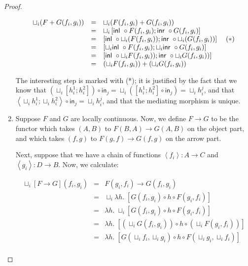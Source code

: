 \begin{proof}
\begin{enumerate}
\begin{displaymath}
\begin{array}{lcl}
  \sqcup_i (F + G (f_i,g_i)) 
   & = & \sqcup_i (F(f_i,g_i) + G(f_i,g_i)) \\
   & = & \sqcup_i \left[\mbox{\textsf{{inl }}}\circ F(f_i,g_i); 
                        \mbox{\textsf{{inr }}}\circ G(f_i,g_i)\right]\\
   & = & \left[\mbox{\textsf{{inl }}}\circ \sqcup_i (F(f_i,g_i));
               \mbox{\textsf{{inr }}}\circ \sqcup_i (G(f_i,g_i))\right] \;\;\;\;(*)\\
   & = & \left[\sqcup_i \mbox{\textsf{{inl }}}\circ F(f_i,g_i);
               \sqcup_i \mbox{\textsf{{inr }}}\circ G(f_i,g_i) \right]\\
   & = & \left[\mbox{\textsf{{inl }}}\circ \sqcup_i F(f_i,g_i));
               \mbox{\textsf{{inr }}}\circ \sqcup_i G(f_i,g_i))\right]\\
   & = & (\sqcup_i F(f_i,g_i)) + (\sqcup_i G(f_i,g_i))\\
\end{array}
\end{displaymath}

The interesting step is marked with (*); it is justified by the fact
that we know that $(\sqcup_i \left[h^1_i;h^2_i\right]) \circ
\mathsf{in}_j = 
\sqcup_i (\left[h^1_i;h^2_i\right] \circ \mathsf{in}_j) = 
\sqcup_i h^j_i$, and that $\left<\sqcup_i h^1_i; \sqcup_i
h^2_i\right> \circ \mathsf{in}_j = \sqcup_i h^j_i$, and that the mediating
morphism is unique.

\item Suppose $F$ and $G$ are locally continuous. Now, we define 
$F \to G$ to be the functor which takes $(A,B)$ to $F(B,A) \to G(A,B)$
on the object part, and which takes $(f,g)$ to $F(g,f) \to G(f,g)$ on
the arrow part.
 
Next, suppose that we have a chain of functions $\left<f_i\right> : A \to C$ 
and $\left<g_i\right> : D \to B$. Now, we calculate:
 
\begin{displaymath}
\begin{array}{lcl}
\sqcup_i [F \to G](f_i,g_i) & = & F(g_i,f_i) \to G(f_i,g_i) \\
& = & 
  \sqcup_i \lambda h.\; [G(f_i,g_i) \circ h \circ F(g_i, f_i)] \\
& = & 
  \lambda h.\; \sqcup_i [G(f_i,g_i) \circ h \circ F(g_i, f_i)]  \\
& = & 
  \lambda h.\; [(\sqcup_i G(f_i,g_i)) \circ h \circ (\sqcup_i F(g_i, f_i))] \\
& = & 
  \lambda h.\; [G(\sqcup_i f_i, \sqcup_ig_i) \circ h \circ 
                F(\sqcup_i g_i, \sqcup_i f_i)] \\
\end{array}
\end{displaymath}


\end{enumerate}
\end{proof}
